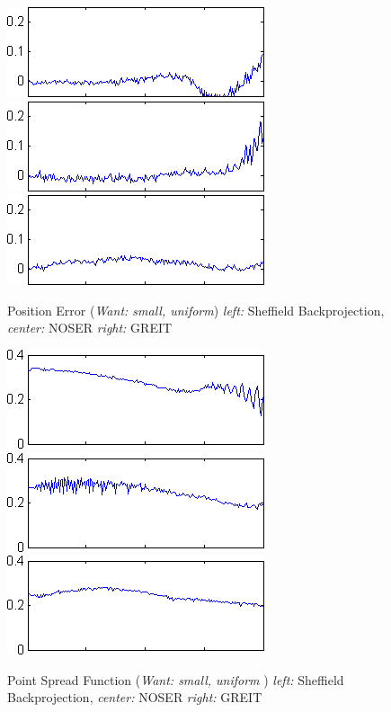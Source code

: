 \documentclass[12pt]{iopart}
\begin{document}
\begin{figure}[bhtp]
\begin{center}
  \includegraphics[width= 0.3 \textwidth]
{../../tutorial/GREIT-evaluation/simulation_test_imgs/simulation_test04_13.png}
  \includegraphics[width= 0.3 \textwidth]
{../../tutorial/GREIT-evaluation/simulation_test_imgs/simulation_test04_23.png}
  \includegraphics[width= 0.3 \textwidth]
{../../tutorial/GREIT-evaluation/simulation_test_imgs/simulation_test04_43.png}
\caption{ \label{fig:rimage}
Position Error ({\em Want: small, uniform})
{\em left:} Sheffield Backprojection,
{\em center:} NOSER
{\em right:} GREIT
}
\end{center}
\end{figure}

\begin{figure}[bhtp]
\begin{center}
  \includegraphics[width= 0.3 \textwidth]
{../../tutorial/GREIT-evaluation/simulation_test_imgs/simulation_test04_14.png}
  \includegraphics[width= 0.3 \textwidth]
{../../tutorial/GREIT-evaluation/simulation_test_imgs/simulation_test04_24.png}
  \includegraphics[width= 0.3 \textwidth]
{../../tutorial/GREIT-evaluation/simulation_test_imgs/simulation_test04_44.png}
\caption{ \label{fig:rimage}
Point Spread Function ({\em Want: small, uniform })
{\em left:} Sheffield Backprojection,
{\em center:} NOSER
{\em right:} GREIT
}
\end{center}
\end{figure}
\end{document}
